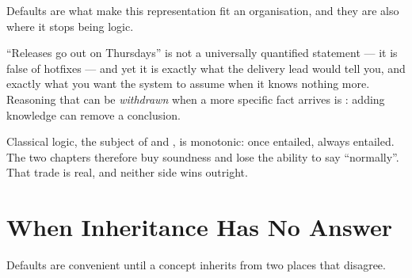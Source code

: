 \begin{conceptbox}
Defaults are what make this representation fit an organisation, and they are also
where it stops being logic.

``Releases go out on Thursdays'' is not a universally quantified statement --- it
is false of hotfixes --- and yet it is exactly what the delivery lead would tell
you, and exactly what you want the system to assume when it knows nothing more.
Reasoning that can be \emph{withdrawn} when a more specific fact arrives is
: adding knowledge can remove a conclusion.

Classical logic, the subject of  and , is
monotonic: once entailed, always entailed. The two chapters therefore buy soundness
and lose the ability to say ``normally''. That trade is real, and neither side wins
outright.
\end{conceptbox}

\section{When Inheritance Has No Answer}

Defaults are convenient until a concept inherits from two places that disagree.

